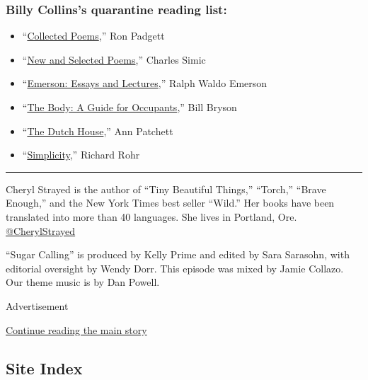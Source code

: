 \hypertarget{billy-collinss-quarantine-reading-list}{%
\subsubsection{\texorpdfstring{\textbf{Billy Collins's quarantine
reading
list:}}{Billy Collins's quarantine reading list:}}\label{billy-collinss-quarantine-reading-list}}

\begin{itemize}
\item
  ``\href{https://www.indiebound.org/book/9781566893428}{Collected
  Poems},'' Ron Padgett
\item
  ``\href{https://www.indiebound.org/book/9780547928289?aff=NPR}{New and
  Selected Poems},'' Charles Simic
\item
  ``\href{https://www.indiebound.org/book/9780940450158}{Emerson: Essays
  and Lectures},'' Ralph Waldo Emerson
\item
  ``\href{https://www.indiebound.org/book/9780385539302}{The Body: A
  Guide for Occupants},'' Bill Bryson
\item
  ``\href{https://www.indiebound.org/book/9780062963673}{The Dutch
  House},'' Ann Patchett
\item
  ``\href{https://www.indiebound.org/book/9780824521158}{Simplicity},''
  Richard Rohr
\end{itemize}

\begin{center}\rule{0.5\linewidth}{\linethickness}\end{center}

Cheryl Strayed is the author of ``Tiny Beautiful Things,'' ``Torch,''
``Brave Enough,'' and the New York Times best seller ``Wild.'' Her books
have been translated into more than 40 languages. She lives in Portland,
Ore.
\href{https://twitter.com/CherylStrayed?ref_src=twsrc\%5Egoogle\%7Ctwcamp\%5Eserp\%7Ctwgr\%5Eauthor}{@CherylStrayed}

``Sugar Calling'' is produced by Kelly Prime and edited by Sara
Sarasohn, with editorial oversight by Wendy Dorr. This episode was mixed
by Jamie Collazo. Our theme music is by Dan Powell.

Advertisement

\protect\hyperlink{after-bottom}{Continue reading the main story}

\hypertarget{site-index}{%
\subsection{Site Index}\label{site-index}}

